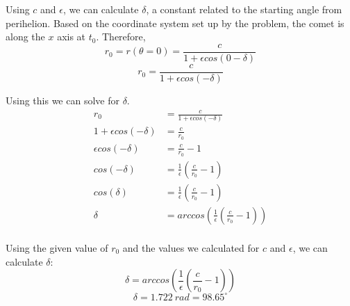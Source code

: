 \documentclass{article}
\begin{document}
Using $c$ and $\epsilon$, we can calculate $\delta$, a constant related to the starting angle from perihelion. 
Based on the coordinate system set up by the problem, the comet is along the $x$ axis at $t_0$. Therefore, 
$$r_0 = r(\theta = 0) = \frac{c}{1 + \epsilon cos(0 - \delta)}$$
$$r_0 = \frac{c}{1 + \epsilon cos(- \delta)}$$

Using this we can solve for $\delta$. 
\begin{align*}
    r_0 &= \frac{c}{1 + \epsilon cos(- \delta)} \\
    1 + \epsilon cos(- \delta) &= \frac{c}{r_0} \\
    \epsilon cos(- \delta) &= \frac{c}{r_0} - 1 \\
    cos(- \delta) &= \frac{1}{\epsilon} \left( \frac{c}{r_0} - 1 \right) \\
    cos(\delta) &= \frac{1}{\epsilon} \left( \frac{c}{r_0} - 1 \right) \\
    \delta &= arccos\left( \frac{1}{\epsilon} \left( \frac{c}{r_0} - 1 \right) \right) \\
\end{align*}

Using the given value of $r_0$ and the values we calculated for $c$ and $\epsilon$, we can calculate $\delta$:
$$\boxed{\delta = arccos\left( \frac{1}{\epsilon} \left( \frac{c}{r_0} - 1 \right) \right)}$$
$$\boxed{\delta = 1.722\ rad = 98.65 ^{\circ}}$$
\end{document}
